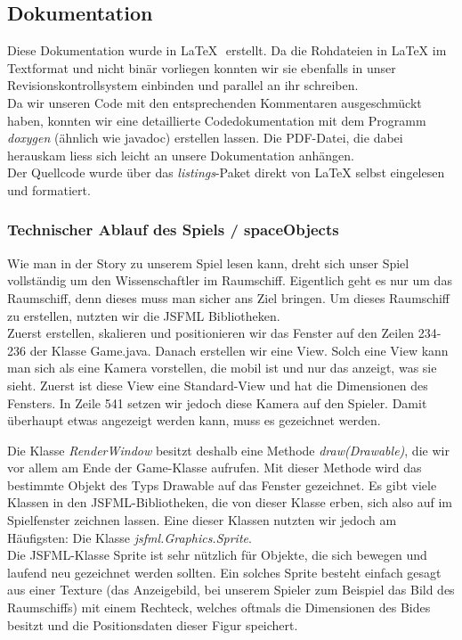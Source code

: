 \documentclass[12pt,a4paper]{scrartcl}
\begin{document}
\subsection{Dokumentation}
Diese Dokumentation wurde in \LaTeX \,\, erstellt. Da die Rohdateien in LaTeX im Textformat und nicht
binär vorliegen konnten wir sie ebenfalls in unser Revisionskontrollsystem einbinden und parallel
an ihr schreiben.\\

Da wir unseren Code mit den entsprechenden Kommentaren ausgeschmückt haben,
konnten wir eine detaillierte Codedokumentation mit dem Programm \textit{doxygen} (ähnlich wie javadoc) erstellen lassen.
Die PDF-Datei, die dabei herauskam liess sich leicht an unsere Dokumentation anhängen.\\

Der Quellcode wurde über das \textit{listings}-Paket direkt von LaTeX selbst eingelesen und formatiert.

\subsubsection{Technischer Ablauf des Spiels / spaceObjects}
Wie man in der Story zu unserem Spiel lesen kann, dreht sich unser Spiel vollständig um den Wissenschaftler im Raumschiff. Eigentlich geht es nur um das Raumschiff, denn dieses muss man sicher ans Ziel bringen.
Um dieses Raumschiff zu erstellen, nutzten wir die JSFML Bibliotheken.	\\

Zuerst erstellen, skalieren und positionieren wir das Fenster auf den Zeilen 234-236 der Klasse Game.java.
Danach erstellen wir eine View.
Solch eine View kann man sich als eine Kamera vorstellen, die mobil ist und nur das anzeigt, was sie sieht.
Zuerst ist diese View eine Standard-View und hat die Dimensionen des Fensters.
In Zeile 541 setzen wir jedoch diese Kamera auf den Spieler.
Damit überhaupt etwas angezeigt werden kann, muss es gezeichnet werden. 

Die Klasse \textit{RenderWindow} besitzt deshalb eine Methode \textit{draw(Drawable)}, die wir vor allem am Ende der Game-Klasse aufrufen.
Mit dieser Methode wird das bestimmte Objekt des Typs Drawable auf das Fenster gezeichnet.
Es gibt viele Klassen in den JSFML-Bibliotheken, die von dieser Klasse erben, sich also auf im Spielfenster zeichnen lassen.
Eine dieser Klassen nutzten wir jedoch am Häufigsten: Die Klasse \textit{jsfml.Graphics.Sprite}.		\\
Die JSFML-Klasse Sprite ist sehr nützlich für Objekte, die sich bewegen und laufend neu gezeichnet werden sollten.
Ein solches Sprite besteht einfach gesagt aus einer Texture (das Anzeigebild, bei unserem Spieler zum Beispiel das Bild des Raumschiffs) mit einem Rechteck,
welches oftmals die Dimensionen des Bides besitzt und die Positionsdaten dieser Figur speichert.
\end{document}
